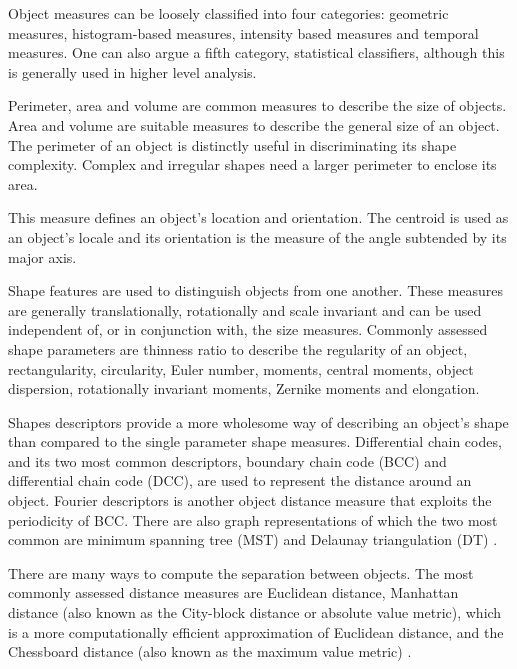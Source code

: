 Object measures can be loosely classified into four categories: geometric measures, histogram-based measures, intensity based measures and temporal measures. One can also argue a fifth category, statistical classifiers, although this is generally used in higher level analysis.

\begin{definition}
	Perimeter, area and volume are common measures to describe the size of objects.
	Area and volume are suitable measures to describe the general size of an object.
	The perimeter of an object is distinctly useful in discriminating its shape complexity. Complex and irregular shapes need a larger perimeter to enclose its area.
\end{definition}

\begin{definition}
	This measure defines an object's location and orientation.
	The centroid is used as an object's locale and its orientation is the measure of the angle subtended by its major axis.
\end{definition}

\begin{definition}
	Shape features are used to distinguish objects from one another.
	These measures are generally translationally, rotationally and scale invariant and can be used independent of, or in conjunction with, the size measures.
	Commonly assessed shape parameters are thinness ratio to describe the regularity of an object, rectangularity, circularity, Euler number, moments, central moments, object dispersion, rotationally invariant moments, Zernike moments and elongation.
\end{definition}

\begin{definition}
	Shapes descriptors provide a more wholesome way of describing an object's shape than compared to the single parameter shape measures.
	Differential chain codes, and its two most common descriptors, boundary chain code (BCC) and differential chain code (DCC), are used to represent the distance around an object.
	Fourier descriptors is another object distance measure that exploits the periodicity of BCC.
	There are also graph representations of which the two most common are minimum spanning tree (MST) \citep{Giesen2014,Yuan2009} and Delaunay triangulation (DT) \citep{Kozubek2000,Attali1997}.
\end{definition}

\begin{definition}
	There are many ways to compute the separation between objects.
	The most commonly assessed distance measures are Euclidean distance, Manhattan distance (also known as the City-block distance or absolute value metric), which is a more computationally efficient approximation of Euclidean distance, and the Chessboard distance (also known as the maximum value metric) \citep{French2008,Zinchuk2007}.
\end{definition}

